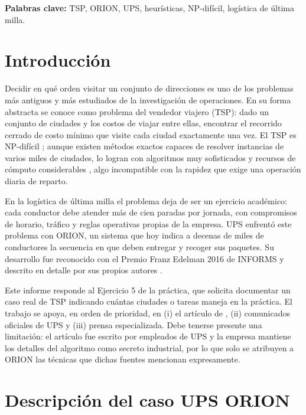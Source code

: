 \documentclass[11pt,a4paper]{article}
\begin{document}
\smallskip\noindent\textbf{Palabras clave:} TSP, ORION, UPS, heurísticas, NP-difícil, logística de última milla.
\normalsize

\section{Introducción}
Decidir en qué orden visitar un conjunto de direcciones es uno de los problemas más antiguos y más estudiados de la investigación de operaciones. En su forma abstracta se conoce como problema del vendedor viajero (TSP): dado un conjunto de ciudades y los costos de viajar entre ellas, encontrar el recorrido cerrado de costo mínimo que visite cada ciudad exactamente una vez. El TSP es NP-difícil \parencite{garey1979}; aunque existen métodos exactos capaces de resolver instancias de varios miles de ciudades, lo logran con algoritmos muy sofisticados y recursos de cómputo considerables \parencite{applegate2006}, algo incompatible con la rapidez que exige una operación diaria de reparto.

En la logística de última milla el problema deja de ser un ejercicio académico: cada conductor debe atender más de cien paradas por jornada, con compromisos de horario, tráfico y reglas operativas propias de la empresa. UPS enfrentó este problema con ORION, un sistema que hoy indica a decenas de miles de conductores la secuencia en que deben entregar y recoger sus paquetes. Su desarrollo fue reconocido con el Premio Franz Edelman 2016 de INFORMS y descrito en detalle por sus propios autores \parencite{holland2017}.

Este informe responde al Ejercicio 5 de la práctica, que solicita documentar un caso real de TSP indicando cuántas ciudades o tareas maneja en la práctica. El trabajo se apoya, en orden de prioridad, en (i) el artículo de \textcite{holland2017}, (ii) comunicados oficiales de UPS y (iii) prensa especializada. Debe tenerse presente una limitación: el artículo fue escrito por empleados de UPS y la empresa mantiene los detalles del algoritmo como secreto industrial, por lo que solo se atribuyen a ORION las técnicas que dichas fuentes mencionan expresamente.

\section{Descripción del caso UPS ORION}
\end{document}
